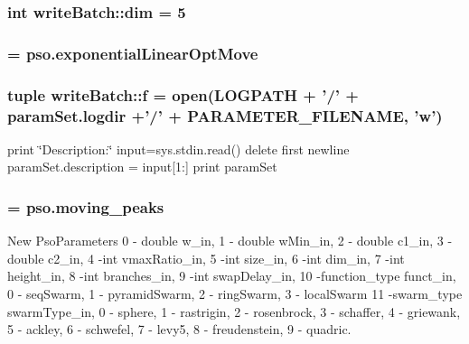 \hypertarget{namespacewriteBatch_497c37cea4733fbbe789cebd0d9e16fa}{
\subsubsection{\setlength{\rightskip}{0pt plus 5cm}int {\bf writeBatch::dim} = 5}}
\label{namespacewriteBatch_497c37cea4733fbbe789cebd0d9e16fa}


\hypertarget{namespacewriteBatch_510f244e239a0e64ed398d02d8ff5ee8}{
\subsubsection{ = {\bf pso.exponentialLinearOptMove}}}
\label{namespacewriteBatch_510f244e239a0e64ed398d02d8ff5ee8}


\hypertarget{namespacewriteBatch_382374a7f7c4784df8be182d7eee7b19}{
\subsubsection{\setlength{\rightskip}{0pt plus 5cm}tuple {\bf writeBatch::f} = open({\bf LOGPATH} + '/' + paramSet.logdir +'/' + {\bf PARAMETER\_\-FILENAME}, '{\bf w}')}}
\label{namespacewriteBatch_382374a7f7c4784df8be182d7eee7b19}


print \char`\"{}Description:\char`\"{} input=sys.stdin.read() delete first newline paramSet.description = input\mbox{[}1:\mbox{]} print paramSet 

\hypertarget{namespacewriteBatch_e7d20431673b44f9a24a312852f90f95}{
\subsubsection{ = {\bf pso.moving\_\-peaks}}}
\label{namespacewriteBatch_e7d20431673b44f9a24a312852f90f95}


New PsoParameters 0 - double w\_\-in, 1 - double wMin\_\-in, 2 - double c1\_\-in, 3 - double c2\_\-in, 4 -int vmaxRatio\_\-in, 5 -int size\_\-in, 6 -int dim\_\-in, 7 -int height\_\-in, 8 -int branches\_\-in, 9 -int swapDelay\_\-in, 10 -function\_\-type funct\_\-in, 0 - seqSwarm, 1 - pyramidSwarm, 2 - ringSwarm, 3 - localSwarm 11 -swarm\_\-type swarmType\_\-in, 0 - sphere, 1 - rastrigin, 2 - rosenbrock, 3 - schaffer, 4 - griewank, 5 - ackley, 6 - schwefel, 7 - levy5, 8 - freudenstein, 9 - quadric. 

